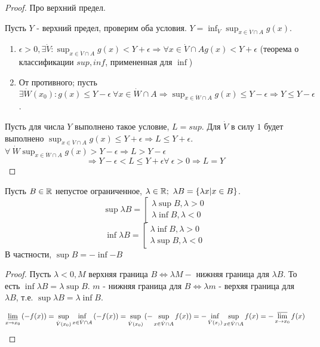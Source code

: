 \documentclass[12pt]{report}
\begin{document}
\begin{proof}
Про верхний предел.

Пусть $Y$ - верхний предел, проверим оба условия. $Y = \inf_{\dot V}{\sup_{x \in \dot V \cap A}{g(x)}}$. 

\begin{enumerate}
\item
$\epsilon > 0, \exists \dot V: \sup_{x \in \dot V \cap A}{g(x) < Y + \epsilon} \Rightarrow \forall x \in \dot V \cap A g(x) < Y + \epsilon$ (теорема о классификации $sup, inf$, примененная для $\inf$)

\item 
От противного; пусть $\exists \dot W(x_0): g(x) \le Y - \epsilon ~\forall x \in \dot W \cap A \Rightarrow \sup_{x \in \dot W \cap A}{g(x)} \le Y - \epsilon \Rightarrow Y \le Y - \epsilon$.
\end{enumerate}

Пусть для числа $Y$ выполнено такое условие, $L = sup$. Для $\dot V$ в силу $1$ будет выполнено $\sup_{x \in \dot V \cap A}{g(x)} \le Y + \epsilon \Rightarrow L \le Y + \epsilon$. $\forall ~\dot W \sup_{x \in \dot W \cap A}{g(x)} > Y - \epsilon \Rightarrow L > Y - \epsilon$
$$\Rightarrow Y - \epsilon < L \le Y + \epsilon \forall ~\epsilon > 0 \Rightarrow L = Y$$
\end{proof}

\begin{st}
Пусть $B \in \mathbb{R}$ непустое ограниченное, $\lambda \in \mathbb{R}; ~\lambda B = \{\lambda x | x \in B\}$.
$$
\sup{\lambda B} = \left[
\begin{matrix}
\lambda \sup{B}, \lambda > 0\\
\lambda \inf{B}, \lambda < 0
\end{matrix}\right.
$$
$$
\inf{\lambda B} = \left[
\begin{matrix}
\lambda \inf{B}, \lambda > 0\\
\lambda \sup{B}, \lambda < 0
\end{matrix}\right.
$$
В частности, $\sup{B} = -\inf{-B}$
\end{st}
\begin{proof}
Пусть $\lambda < 0, M$ верхняя граница $B \Leftrightarrow \lambda M - $ нижняя граница для $\lambda B$. То есть $\inf{\lambda B} = \lambda \sup{B}$. $m$ - нижняя граница для $B \Leftrightarrow \lambda m$ - верхяя граница для $\lambda B$, т.е. $\sup{\lambda B} = \lambda \inf{B}$.

$$\varliminf_{x \to x_0}{(-f(x))} = \sup_{\dot V(x_0)}{\inf_{x \in \dot V \cap A}{(-f(x))}} = \sup_{\dot V(x_0)}{(-\sup_{x \in \dot V \cap A}{f(x)})} = - \inf_{\dot V(x_))}{\sup_{x \in \dot V \cap A}{f(x)}} = -\varlimsup_{x \to x_0}{f(x)}$$
\end{proof}
\end{document}
